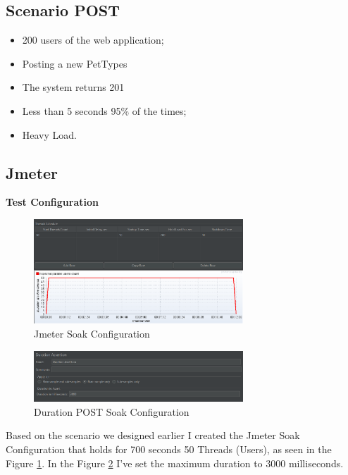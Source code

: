 \documentclass[a4paper,11pt,openright,BCOR=15mm]{scrbook}
\begin{document}
		  \subsection{Scenario POST}
		  \begin{itemize}
			  \item 200 users of the web application;
			  \item Posting a new PetTypes
			  \item The system returns 201
			  \item Less than 5 seconds 95\% of the times;
			  \item Heavy Load.
		  \end{itemize}
  
		  \subsection{Jmeter}
		  \textbf{Test Configuration}
		\begin{figure}[H]
			  \centering
			  \includegraphics[width=0.7\textwidth]{figs/Performance/Test Configuration/JMETER-SOAK.png}
			  \caption{Jmeter Soak Configuration}
			  \label{fig:JMETER-Soak-POST}
		\end{figure}
		\begin{figure}[H]
			\centering
			\includegraphics[width=0.7\textwidth]{figs/Performance/Test Configuration/Duration-SOAK-LOAD-JMETER.png}
			\caption{Duration POST Soak Configuration}
			\label{fig:DurationPostSoak}
		\end{figure}
		Based on the scenario we designed earlier I created the Jmeter Soak Configuration that holds for 700 seconds 50 Threads (Users), as seen in the Figure \ref{fig:JMETER-Soak-POST}. In the Figure \ref{fig:DurationPostSoak} I've set the maximum duration to 3000 milliseconds.
\end{document}
